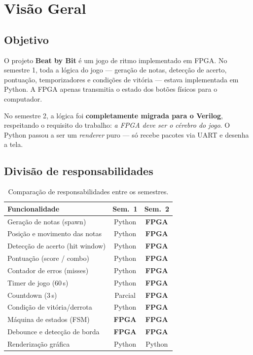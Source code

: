 \documentclass[12pt,a4paper]{article}
\begin{document}
\tableofcontents
\newpage

\section{Visão Geral}

\subsection{Objetivo}

O projeto \textbf{Beat by Bit} é um jogo de ritmo implementado em FPGA. No semestre 1, toda a lógica do jogo — geração de notas, detecção de acerto, pontuação, temporizadores e condições de vitória — estava implementada em Python. A FPGA apenas transmitia o estado dos botões físicos para o computador.

No semestre 2, a lógica foi \textbf{completamente migrada para o Verilog}, respeitando o requisito do trabalho: \emph{a FPGA deve ser o cérebro do jogo}. O Python passou a ser um \emph{renderer} puro — só recebe pacotes via UART e desenha a tela.

\subsection{Divisão de responsabilidades}

\begin{table}[H]
\centering
\begin{tabularx}{\textwidth}{Xcc}
\toprule
\textbf{Funcionalidade} & \textbf{Sem.~1} & \textbf{Sem.~2} \\
\midrule
Geração de notas (spawn)         & Python & \textbf{FPGA} \\
Posição e movimento das notas    & Python & \textbf{FPGA} \\
Detecção de acerto (hit window)  & Python & \textbf{FPGA} \\
Pontuação (score / combo)        & Python & \textbf{FPGA} \\
Contador de erros (misses)       & Python & \textbf{FPGA} \\
Timer de jogo (60\,s)            & Python & \textbf{FPGA} \\
Countdown (3\,s)                 & Parcial & \textbf{FPGA} \\
Condição de vitória/derrota      & Python & \textbf{FPGA} \\
Máquina de estados (FSM)         & \textbf{FPGA} & \textbf{FPGA} \\
Debounce e detecção de borda     & \textbf{FPGA} & \textbf{FPGA} \\
Renderização gráfica             & Python & Python \\
\bottomrule
\end{tabularx}
\caption{Comparação de responsabilidades entre os semestres.}
\end{table}
\end{document}
